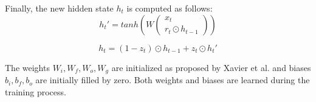 Finally, the new hidden state $h_t$ is computed as follows:
\begin{equation}
    h_t' = tanh \left( W
        \begin{pmatrix}
            x_t \\
            r_t \odot h_{t-1}
        \end{pmatrix}
        \right)
\end{equation}

\begin{equation}
    h_t = (1-z_t) \odot h_{t-1} + z_t \odot h_t'
\end{equation}


The weights $W_i, W_f, W_o, W_g$ are initialized as proposed by Xavier et al. 
\cite{Xavier} and biases $b_i, b_f, b_o$ are initially filled by zero.
Both weights and biases are learned during the training process.
